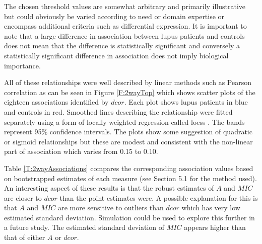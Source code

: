 \documentclass[a4paper, 12pt]{report}
\begin{document}
The chosen threshold values are somewhat arbitrary and primarily illustrative but could obviously be varied according to need or domain expertise or encompass additional criteria such as differential expression. It is important to note that a large difference in association  between lupus patients and controls does not mean that the difference is statistically significant and conversely a statistically significant difference in association does not imply biological importance. 
 
All of these relationships were well described by linear methods such as Pearson correlation as can be seen in Figure \ref{F:2wayTop} which shows scatter plots of the eighteen  associations identified by $dcor$. Each plot shows lupus patients in blue and controls in red. Smoothed lines describing the relationship were fitted separately using a form of locally weighted regression called loess \cite{MASS}. The bands represent 95\% confidence intervals. The plots show some suggestion of quadratic or sigmoid relationships but these are modest and consistent with the non-linear part of association which varies from 0.15 to 0.10. 

Table \ref{T:2wayAssociations} compares the corresponding association values based on bootstrapped estimates of each measure (see Section 5.1 for the method used). An interesting aspect of these results is that the robust estimates of $A$ and $MIC$ are closer to $dcor$ than the point estimates were. A possible explanation for this is that $A$ and $MIC$ are more sensitive to outliers than $dcor$ which has very low estimated standard deviation. Simulation could be used to explore this further in a future study. The estimated standard deviation of $MIC$ appears higher than that of either $A$ or $dcor$.
\end{document}
